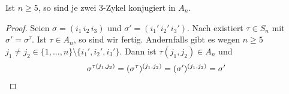 \begin{lemma}
	Ist $n \geq 5$, so sind je zwei $3$-Zykel konjugiert in $A_n$.
\end{lemma}
\begin{proof}
	Seien $\sigma=(i_1\, i_2\, i_3)$ und $\sigma'=(i_1'\, i_2'\, i_3')$. Nach  existiert $\tau\in S_n$ mit $\sigma'=\sigma^\tau$. Ist $\tau\in A_n$, so sind wir fertig. Andernfalls gibt es wegen $n\ge 5$ $j_1\neq j_2\in\{1,...,n\}\setminus \{i_1',i_2',i_3'\}$. Dann ist $\tau(j_1,j_2)\in A_n$ und
	\begin{align}
		\sigma^{\tau(j_1,j_2)} = (\sigma^\tau)^{(j_1,j_2)} = (\sigma')^{(j_1,j_2)} = \sigma'\notag
	\end{align}
\end{proof}
